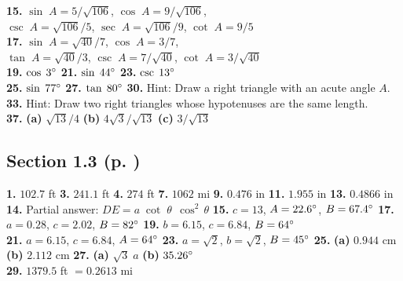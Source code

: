 \begin{multicols}{2}
\textbf{15.} $\sin\;A = 5/\sqrt{106}$, $\cos\;A = 9/\sqrt{106}$,\\
$\csc\;A = \sqrt{106}/5$, $\sec\;A = \sqrt{106}/9$, $\cot\;A = 9/5$\\
\textbf{17.} $\sin\;A = \sqrt{40}/7$, $\cos\;A = 3/7$,\\$\tan\;A = \sqrt{40}/3$,
$\csc\;A = 7/\sqrt{40}$, $\cot\;A = 3/\sqrt{40}$\\
\textbf{19.} $\cos\;3^\circ$ \quad \textbf{21.} $\sin\;44^\circ$ \quad
\textbf{23.} $\csc\;13^\circ$\\
\textbf{25.} $\sin\;77^\circ$ \quad
\textbf{27.} $\tan\;80^\circ$ \quad \textbf{30.} Hint: Draw a right triangle with an acute
angle $A$.\\
\textbf{33.} Hint: Draw two right triangles whose hypotenuses are the same length.\\
\textbf{37.} \textbf{(a)} $\sqrt{13}/4$ \textbf{(b)} $4\sqrt{3}/\sqrt{13}$
\textbf{(c)} $3/\sqrt{13}$
\subsection*{Section 1.3 (p. \pageref{sec1dot3})}
\textbf{1.} $102.7$ ft \quad \textbf{3.} $241.1$ ft \quad \textbf{4.} $274$ ft \quad
\textbf{7.} $1062$ mi \quad \textbf{9.} $0.476$ in \quad \textbf{11.} $1.955$ in \quad
\textbf{13.} $0.4866$ in \quad \textbf{14.} Partial answer: $DE=a\;\cot\;\theta\;\,\cos^2\,\theta$
\quad \textbf{15.} $c=13$, $A=22.6^\circ$, $B=67.4^\circ$ \quad \textbf{17.} $a=0.28$, $c=2.02$,
$B=82^\circ$ \quad \textbf{19.} $b=6.15$, $c=6.84$, $B=64^\circ$\\
\textbf{21.} $a=6.15$, $c=6.84$, $A=64^\circ$ \quad \textbf{23.} $a=\sqrt{2}$, $b=\sqrt{2}$,
$B=45^\circ$ \quad \textbf{25.} \textbf{(a)} $0.944$ cm\\\textbf{(b)} $2.112$ cm \quad
\textbf{27.} \textbf{(a)} $\sqrt{3}\;a$ \quad \textbf{(b)} $35.26^\circ$\\\textbf{29.} $1379.5$ ft $= 0.2613$ mi

\end{multicols}
